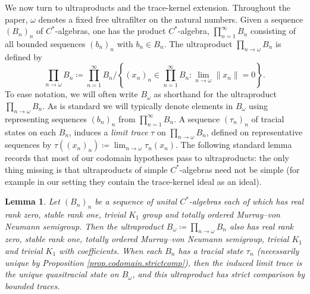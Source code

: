 \documentclass[reqno]{amsart}
\newtheorem{lem}[thm]{Lemma}
\theoremstyle{definition}
\theoremstyle{remark}
\numberwithin{equation}{section}
\theoremstyle{definition}
\begin{document}
We now turn to ultraproducts and the trace-kernel extension. Throughout the paper, $\omega$ denotes a fixed free ultrafilter on the natural numbers.  Given a sequence $(B_n)_n$ of $C^*$-algebras, one has the product $C^*$-algebra,  $\prod_{n=1}^\infty B_n$ consisting of all bounded sequences $(b_n)_n$ with $b_n\in B_n$. The ultraproduct $\prod_{n\to\omega} B_n$ is defined by 
\begin{equation}
\prod_{n\to\omega}B_n \coloneqq \prod_{n=1}^\infty B_n\bigg/\left\{(x_n)_{n}\in\prod_{n=1}^\infty B_n:\lim_{n\to\omega}\|x_n\|=0\right\}.
\end{equation} 
To ease notation, we will often write $B_\omega$ as shorthand for the ultraproduct $\prod_{n\to\omega}B_n$. As is standard we will typically denote elements in $B_\omega$ using representing sequences $(b_n)_n$ from $\prod_{n=1}^\infty B_n$.  A sequence $(\tau_n)_n$ of tracial states on each $B_n$, induces a \emph{limit trace} $\tau$ on $\prod_{n\to\omega}B_n$, defined on representative sequences by $\tau((x_n)_{n})\coloneqq\lim_{n\to\omega}\tau_n(x_n)$.  The following standard lemma records that most of our codomain hypotheses pass to ultraproducts: the only thing missing is that ultraproducts of simple $C^*$-algebras need not be simple (for example in our setting they contain the trace-kernel ideal as an ideal).

\begin{lem}\label{prop:B_omega} Let $(B_n)_{n}$ be a sequence of unital $C^*$-algebras each of which has real rank zero, stable rank one, trivial $K_1$ group and totally ordered Murray--von Neumann semigroup. Then the ultraproduct $B_\omega\coloneqq \prod_{n\to\omega}B_n$ also has real rank zero, stable rank one, totally ordered Murray--von Neumann semigroup, trivial $K_1$ and trivial $K_{1}$ with coefficients. When each $B_n$ has a tracial state $\tau_n$ (necessarily unique by Proposition \ref{prop.codomain.strictcomp}), then the induced limit trace is the unique quasitracial state on $B_\omega$, and this ultraproduct has strict comparison by bounded traces.
\end{lem}
\end{document}
